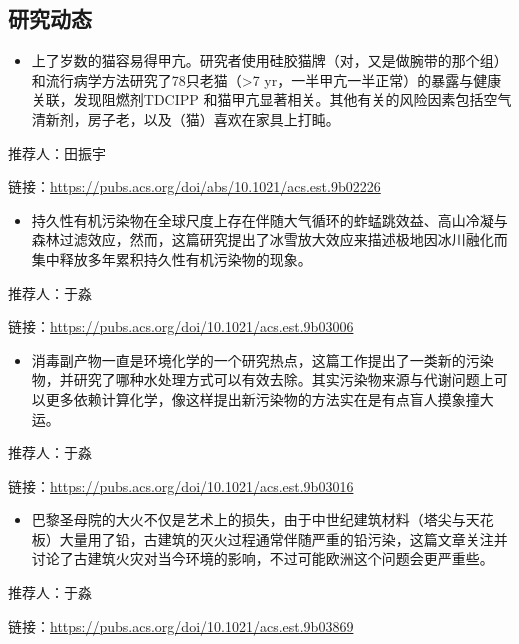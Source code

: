 \documentclass[]{book}
\providecommand{\tightlist}{%
  \setlength{\itemsep}{0pt}\setlength{\parskip}{0pt}}
\begin{document}
\hypertarget{ux7814ux7a76ux52a8ux6001-20}{%
\subsection*{研究动态}\label{ux7814ux7a76ux52a8ux6001-20}}

\begin{itemize}
\tightlist
\item
  上了岁数的猫容易得甲亢。研究者使用硅胶猫牌（对，又是做腕带的那个组）和流行病学方法研究了78只老猫（\textgreater{}7 yr，一半甲亢一半正常）的暴露与健康关联，发现阻燃剂TDCIPP 和猫甲亢显著相关。其他有关的风险因素包括空气清新剂，房子老，以及（猫）喜欢在家具上打盹。
\end{itemize}

推荐人：田振宇

链接：\url{https://pubs.acs.org/doi/abs/10.1021/acs.est.9b02226}

\begin{itemize}
\tightlist
\item
  持久性有机污染物在全球尺度上存在伴随大气循环的蚱蜢跳效益、高山冷凝与森林过滤效应，然而，这篇研究提出了冰雪放大效应来描述极地因冰川融化而集中释放多年累积持久性有机污染物的现象。
\end{itemize}

推荐人：于淼

链接：\url{https://pubs.acs.org/doi/10.1021/acs.est.9b03006}

\begin{itemize}
\tightlist
\item
  消毒副产物一直是环境化学的一个研究热点，这篇工作提出了一类新的污染物，并研究了哪种水处理方式可以有效去除。其实污染物来源与代谢问题上可以更多依赖计算化学，像这样提出新污染物的方法实在是有点盲人摸象撞大运。
\end{itemize}

推荐人：于淼

链接：\url{https://pubs.acs.org/doi/10.1021/acs.est.9b03016}

\begin{itemize}
\tightlist
\item
  巴黎圣母院的大火不仅是艺术上的损失，由于中世纪建筑材料（塔尖与天花板）大量用了铅，古建筑的灭火过程通常伴随严重的铅污染，这篇文章关注并讨论了古建筑火灾对当今环境的影响，不过可能欧洲这个问题会更严重些。
\end{itemize}

推荐人：于淼

链接：\url{https://pubs.acs.org/doi/10.1021/acs.est.9b03869}
\end{document}
